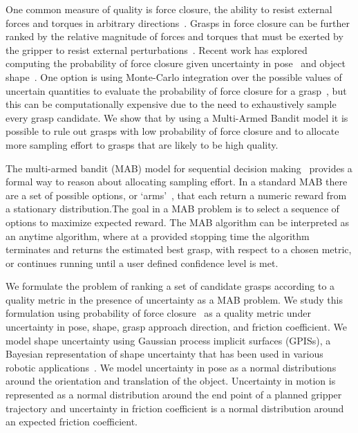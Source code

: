 \documentclass[10pt, conference]{ieeeconf}      %
\begin{document}
One common measure of quality is force closure, the ability to resist external forces and torques in arbitrary directions~\cite{li1988task}.
Grasps in force closure can be further ranked by the relative magnitude of forces and torques that must be exerted by the gripper to resist external perturbations~\cite{ferrari1992}.
Recent work has explored computing the probability of  force closure given uncertainty in pose~\cite{christopoulos2007handling, kim2012physically, weisz2012pose} and object shape~\cite{kehoe2012estimating, mahler2015gp}.
One option is using Monte-Carlo integration over the possible values of uncertain quantities to evaluate the probability of force closure for a grasp~\cite{christopoulos2007handling, kim2012physically, weisz2012pose, kehoe2012estimating, kehoe2012toward}, but this can be computationally expensive due to the need to exhaustively sample every grasp candidate. 
We show that by using a Multi-Armed Bandit model it is possible to rule out grasps with low probability of force closure and to allocate more sampling effort to grasps that are likely to be high quality.

The multi-armed bandit (MAB) model for sequential decision making~\cite{barto1998reinforcement, lai1985asymptotically, robbins1985some} provides a formal way to reason about allocating sampling effort. In a standard MAB there are a set of possible options, or `arms'~\cite{barto1998reinforcement}, that each return a numeric reward from a stationary distribution.The goal in a MAB problem is to  select a sequence of options to maximize expected reward. The MAB algorithm can be interpreted as an anytime algorithm, where at a provided stopping time the algorithm terminates and returns the estimated best grasp, with respect to a chosen metric, or continues running until a user defined confidence level is met. 

We formulate the problem of ranking a set of candidate grasps according to a quality metric in the presence of uncertainty as a MAB problem.
We study this formulation using probability of force closure~\cite{christopoulos2007handling, weisz2012pose, kehoe2012toward} as a quality metric under uncertainty in pose, shape, grasp approach direction, and friction coefficient. 
We model shape uncertainty using Gaussian process implicit surfaces (GPISs), a Bayesian representation of shape uncertainty that has been used in various robotic applications~\cite{dragiev2011, hollinger2013}. 
We model uncertainty in pose as a normal distributions around the orientation and translation of the object.
Uncertainty in motion is represented as a normal distribution around the end point of a planned gripper trajectory and uncertainty in friction coefficient is a normal distribution around an expected friction coefficient.
\end{document}
